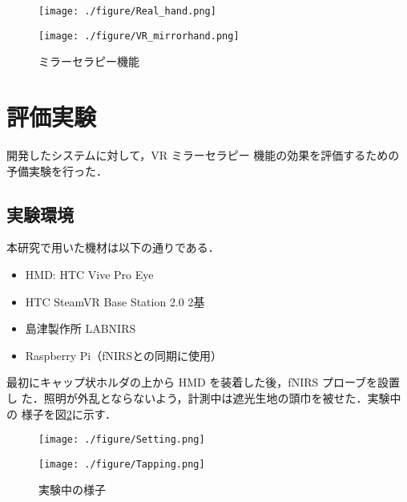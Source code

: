 \begin{figure}[htb]
    \centering
    \begin{minipage}{0.45\linewidth}
        \texttt{[image: ./figure/Real\_hand.png]}
        \label{fig:Inusephoto}
    \end{minipage}
    \begin{minipage}{0.45\linewidth}
        \texttt{[image: ./figure/VR\_mirrorhand.png]}
        \label{fig:HMDdisp}
    \end{minipage}
    \caption{ミラーセラピー機能}
\end{figure}

\section{評価実験}

開発したシステムに対して，VR ミラーセラピー 機能の効果を評価するための
予備実験を行った．

\subsection{実験環境}

本研究で用いた機材は以下の通りである．

\begin{itemize}
    \item HMD: HTC Vive Pro Eye
    \item HTC SteamVR Base Station 2.0 2基
    \item 島津製作所 LABNIRS
    \item Raspberry Pi（fNIRSとの同期に使用）
\end{itemize}

最初にキャップ状ホルダの上から HMD を装着した後，fNIRS プローブを設置し
た．照明が外乱とならないよう，計測中は遮光生地の頭巾を被せた．実験中の
様子を図\ref{fig:task}に示す．

\begin{figure}[htb]
    \begin{minipage}{0.5\hsize}
        \texttt{[image: ./figure/Setting.png]}
    \end{minipage}
    \begin{minipage}{0.5\hsize}
        \texttt{[image: ./figure/Tapping.png]}
    \end{minipage}
    \caption{実験中の様子}
    \label{fig:task}
\end{figure}

